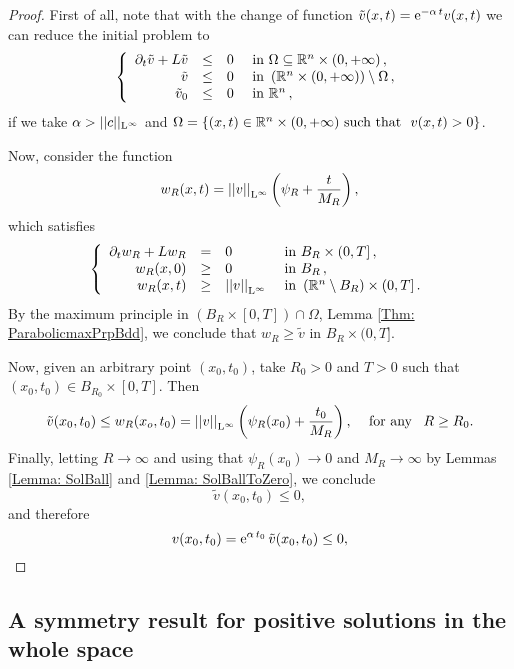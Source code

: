 \begin{proof}
First of all, note that with the change of function $\tilde{v}(x,t) = \mathrm{e}^{-\alpha\,t} v(x,t)$ we can reduce the initial problem to
\begin{equation*}
\left\{\begin{array}{rcll}
\partial_t \tilde{v} + L \tilde{v} &\leq& 0 & \textrm{ in } \Omega \subseteq\mathbb{R}^n\times(0,+\infty)\,,\\
\tilde{v} &\leq& 0 & \textrm{ in }  \left(\mathbb{R}^n\times(0,+\infty)\right) \setminus  \Omega\,,\\
\tilde{v}_0 &\leq& 0 & \textrm{ in } \mathbb{R}^n\,,
\end{array} \right.
\end{equation*}
if we take $\alpha > ||c||_{\mathrm{L}^{\infty}}$ and $\Omega = \{(x,t)\in \mathbb{R}^n\times(0,+\infty) \ \textrm{such that } \ v(x,t) > 0\}$.

Now, consider the function
$$ w_R(x,t) = \left | \left |{v} \right | \right |_{\mathrm{L}^{\infty}} \left(  \psi_R + \frac{t}{M_R} \right), $$
which satisfies
\begin{equation*}
\left\{\begin{array}{rcll}
\partial_t w_R + L w_R &=& 0 & \textrm{ in }B_R\times(0,T]\,,\\
w_R(x,0) &\geq& 0 & \textrm{ in } B_R\,,\\
w_R(x,t) &\geq& \left | \left |{v} \right | \right |_{\mathrm{L}^{\infty}}  & \textrm{ in } \left( \mathbb{R}^n\setminus B_R\right) \times (0,T] \,.
\end{array} \right.
\end{equation*}
By the maximum principle in $(B_R\times[0,T])\cap \Omega$, Lemma \ref{Thm: ParabolicmaxPrpBdd}, we conclude that $ w_R\geq \tilde{v} $ in $B_R\times(0,T]$.

Now, given an arbitrary point $(x_0,t_0)$, take $R_0>0$ and $T>0$ such that $(x_0,t_0)\in B_{R_0}\times [0,T]$. Then
$$ \tilde{v}(x_0,t_0) \leq w_R(x_o,t_0) = \left | \left |{v} \right | \right |_{\mathrm{L}^{\infty}} \left(  \psi_R(x_0) + \frac{t_0}{M_R} \right), \,\,\,\,\,\text{ for any }\,\,\, R\geq R_0. $$
Finally, letting $R \to \infty$ and using that $\psi_R(x_0) \to 0$ and $M_R \to \infty$ by Lemmas \ref{Lemma: SolBall} and \ref{Lemma: SolBallToZero}, we conclude
$$ \tilde{v}(x_0,t_0) \leq 0, $$
and therefore
$$ v(x_0,t_0) = \mathrm{e}^{\alpha\,t_0}\,\tilde{v}(x_0,t_0) \leq 0, $$
\end{proof}


\subsection{A symmetry result for positive solutions in the whole space}

